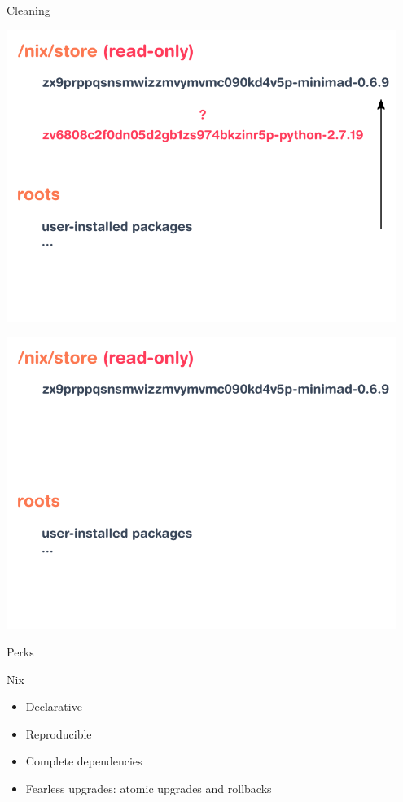 \documentclass[a4paper]{beamer}
\begin{document}
\begin{frame}{Cleaning}
{\begin{center}
        \end{center}
    }
     {
        \begin{center}
            \includegraphics[width=0.95\textwidth]{img/schema-nix-store-gc-3.pdf}
        \end{center}
    }
     {
        \begin{center}
            \includegraphics[width=0.95\textwidth]{img/schema-nix-store-gc-4.pdf}
        \end{center}
    }
\end{frame}

\begin{frame}{Perks}
    \begin{block}{Nix}
        \begin{itemize}
            \item Declarative
            \item Reproducible
            \item Complete dependencies
            \item Fearless upgrades: atomic upgrades and rollbacks
        \end{itemize}
    \end{block}
\end{frame}
\end{document}
